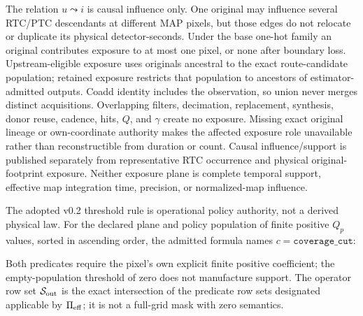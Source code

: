 \documentclass[10pt]{article}
\begin{document}
\SCIMapExposureEquations

The relation \(u\leadsto i\) is causal influence only. One original may
influence several RTC/PTC descendants at different MAP pixels, but those
edges do not relocate or duplicate its physical detector-seconds. Under the
base one-hot family an original contributes exposure to at most one pixel, or
none after boundary loss. Upstream-eligible exposure uses originals ancestral
to the exact route-candidate population; retained exposure restricts that
population to ancestors of estimator-admitted outputs. Coadd identity includes
the observation, so union never merges distinct acquisitions. Overlapping
filters, decimation, replacement, synthesis, donor reuse, cadence, hits,
\(Q\), and \(\gamma\) create no exposure. Missing exact original lineage or
own-coordinate authority makes the affected exposure role unavailable rather
than reconstructible from duration or count. Causal influence/support is
published separately from representative RTC occurrence and physical
original-footprint exposure. Neither exposure plane is complete temporal
support, effective map integration time, precision, or normalized-map
influence.

The adopted v0.2 threshold rule is operational policy authority, not a derived
physical law. For the declared plane and policy population of finite positive \(Q_p\)
values, sorted in ascending order, the admitted formula names
\(c=\texttt{coverage\_cut}\):

\SCIMapThresholdEquations

Both predicates require the pixel's own explicit finite positive coefficient;
the empty-population threshold of zero does not manufacture support. The
operator row set \(\mathcal S_{\rm out}\) is the exact intersection of the
predicate row sets designated applicable by \(\Pi_{\rm eff}\); it is not a
full-grid mask with zero semantics.
\end{document}

